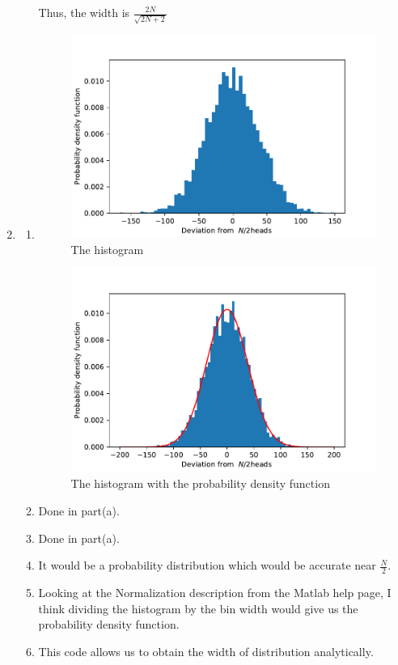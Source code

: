 \documentclass[letterpaper,12pt]{article}
\begin{document}
\begin{enumerate}
\begin{enumerate}
Thus, the width is $\frac{2N}{\sqrt{2N+2}}$
\end{enumerate}
\item
\begin{enumerate}
\item

\begin{figure}[H]
\begin{centering}
\includegraphics[width=5in]{hist.pdf}
\caption{The histogram}
\end{centering}
\end{figure}

\begin{figure}[H]
\begin{centering}
\includegraphics[width=5in]{hist_pdf.pdf}
\caption{The histogram with the probability density function}
\end{centering}
\end{figure}

\item Done in part(a).
\item Done in part(a).
\item It would be a probability distribution which would be accurate near $\frac{N}{2}$.
\item Looking at the Normalization description from the Matlab help page, I think dividing the histogram by the bin width would give us the probability density function.
\item
This code allows us to obtain the width of distribution analytically.



\end{enumerate}
\end{enumerate}
\end{document}

